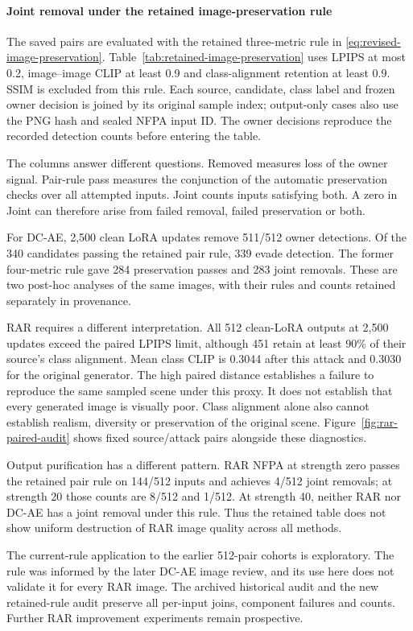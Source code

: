 \paragraph{Joint removal under the retained image-preservation rule}
The saved pairs are evaluated with the retained three-metric rule in \eqref{eq:revised-image-preservation}. Table~\ref{tab:retained-image-preservation} uses LPIPS at most 0.2, image--image CLIP at least 0.9 and class-alignment retention at least 0.9. SSIM is excluded from this rule. Each source, candidate, class label and frozen owner decision is joined by its original sample index; output-only cases also use the PNG hash and sealed NFPA input ID. The owner decisions reproduce the recorded detection counts before entering the table.



The columns answer different questions. Removed measures loss of the owner signal. Pair-rule pass measures the conjunction of the automatic preservation checks over all attempted inputs. Joint counts inputs satisfying both. A zero in Joint can therefore arise from failed removal, failed preservation or both.

For DC-AE, 2,500 clean LoRA updates remove 511/512 owner detections. Of the 340 candidates passing the retained pair rule, 339 evade detection. The former four-metric rule gave 284 preservation passes and 283 joint removals. These are two post-hoc analyses of the same images, with their rules and counts retained separately in provenance.



RAR requires a different interpretation. All 512 clean-LoRA outputs at 2,500 updates exceed the paired LPIPS limit, although 451 retain at least 90\% of their source's class alignment. Mean class CLIP is 0.3044 after this attack and 0.3030 for the original generator. The high paired distance establishes a failure to reproduce the same sampled scene under this proxy. It does not establish that every generated image is visually poor. Class alignment alone also cannot establish realism, diversity or preservation of the original scene. Figure~\ref{fig:rar-paired-audit} shows fixed source/attack pairs alongside these diagnostics.

Output purification has a different pattern. RAR NFPA at strength zero passes the retained pair rule on 144/512 inputs and achieves 4/512 joint removals; at strength 20 those counts are 8/512 and 1/512. At strength 40, neither RAR nor DC-AE has a joint removal under this rule. Thus the retained table does not show uniform destruction of RAR image quality across all methods.

The current-rule application to the earlier 512-pair cohorts is exploratory. The rule was informed by the later DC-AE image review, and its use here does not validate it for every RAR image. The archived historical audit and the new retained-rule audit preserve all per-input joins, component failures and counts. Further RAR improvement experiments remain prospective.


